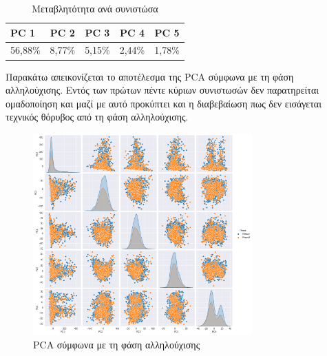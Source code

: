 \documentclass[12pt]{report}
\begin{document}
            \begin{table}[ht]
                \centering
                \caption{Μεταβλητότητα ανά συνιστώσα}
                \begin{tabular}{lcccc} %
                    \toprule
                    \textbf{PC 1} & \textbf{PC 2} & \textbf{PC 3} & \textbf{PC 4} & \textbf{PC 5} \\
                    \midrule
                    56,88\% & 8,77\% & 5,15\% & 2,44\% & 1,78\% \\
                    \bottomrule
                \end{tabular}
                \label{tab:pca}
            \end{table}
            \newpage
            \par
                Παρακάτω απεικονίζεται το αποτέλεσμα της PCA σύμφωνα με τη φάση αλληλούχισης. Εντός των πρώτων πέντε κύριων συνιστωσών δεν παρατηρείται ομαδοποίηση και μαζί με αυτό προκύπτει και η διαβεβαίωση πως δεν εισάγεται τεχνικός θόρυβος από τη φάση αλληλούχισης.
                \begin{figure}[H]
                    \centering
                    \includegraphics[width=0.75\textwidth]{Chapter-2-Section-2.1/ppmi-pca-pd-ctrl-all-visits-hue-phase.png}
                    \caption{PCA σύμφωνα με τη φάση αλληλούχισης}
                    \label{fig:ppmi-pca-pd-ctrl-all-visits-hue-phase}
                \end{figure}
\end{document}
